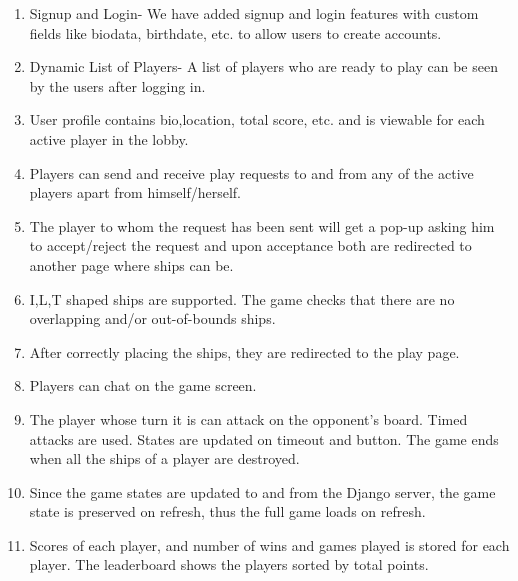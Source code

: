 \documentclass[titlepage]{article}
\begin{document}
\begin{enumerate}
  \item Signup and Login- We have added signup and login features with custom fields like biodata, birthdate, etc. to allow users to create accounts.
  \item Dynamic List of Players- A list of players who are ready to play can be seen by the users after logging in.
  \item User profile contains bio,location, total score, etc. and is viewable for each active player in the lobby.
  \item Players can send and receive play requests to and from any of the active players apart from himself/herself.
  \item The player to whom the request has been sent will get a pop-up asking him to accept/reject the request and upon acceptance both are redirected to another page where ships can be.
  \item I,L,T shaped ships are supported. The game checks that there are no overlapping and/or out-of-bounds ships.
  \item After correctly placing the ships, they are redirected to the play page.
  \item Players can chat on the game screen.
  \item The player whose turn it is can attack on the opponent's board. Timed attacks are used. States are updated on timeout and button. The game ends when all the ships of a player are destroyed.
  \item Since the game states are updated to and from the Django server, the game state is preserved on refresh, thus the full game loads on refresh.
  \item Scores of each player, and number of wins and games played is stored for each player. The leaderboard shows the players sorted by total points.
\end{enumerate}



\end{document}
